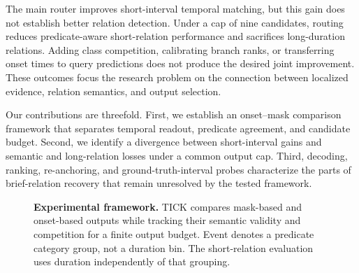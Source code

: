\documentclass[10pt,twocolumn,letterpaper]{article}
\newcommand{\method}{TICK\xspace}
\begin{document}
The main router improves short-interval temporal matching, but this gain does not establish better relation detection. Under a cap of nine candidates, routing reduces predicate-aware short-relation performance and sacrifices long-duration relations. Adding class competition, calibrating branch ranks, or transferring onset times to query predictions does not produce the desired joint improvement. These outcomes focus the research problem on the connection between localized evidence, relation semantics, and output selection.

Our contributions are threefold. First, we establish an onset--mask comparison framework that separates temporal readout, predicate agreement, and candidate budget. Second, we identify a divergence between short-interval gains and semantic and long-relation losses under a common output cap. Third, decoding, ranking, re-anchoring, and ground-truth-interval probes characterize the parts of brief-relation recovery that remain unresolved by the tested framework.

\begin{figure}[t]
\centering
{}
\caption{\textbf{Experimental framework.} \method compares mask-based and onset-based outputs while tracking their semantic validity and competition for a finite output budget. Event denotes a predicate category group, not a duration bin. The short-relation evaluation uses duration independently of that grouping.}
\label{fig:overview}
\end{figure}
\end{document}

